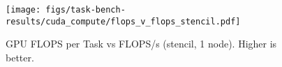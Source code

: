 \begin{figure}[t]
\centering
\texttt{[image: figs/task-bench-results/cuda\_compute/flops\_v\_flops\_stencil.pdf]}
\vspace{-0.5cm}
\caption{GPU FLOPS per Task vs FLOPS/s (stencil, 1 node). Higher is better.\label{fig:cuda-efficiency}}
\vspace{-0.05cm}
\end{figure}
